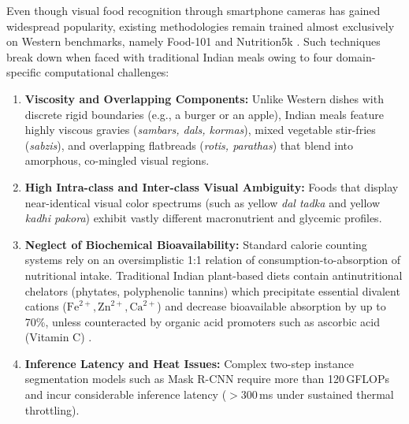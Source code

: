 \documentclass[conference]{IEEEtran}
\begin{document}
Even though visual food recognition through smartphone cameras has gained widespread popularity, existing methodologies remain trained almost exclusively on Western benchmarks, namely Food-101 \cite{bossard2014food101} and Nutrition5k \cite{thames2021nutrition5k}. Such techniques break down when faced with traditional Indian meals owing to four domain-specific computational challenges:
\begin{enumerate}
    \setlength{\itemsep}{1.2pt plus 0.3pt minus 0.2pt}
    \setlength{\parskip}{0pt}
    \item \textbf{Viscosity and Overlapping Components:} Unlike Western dishes with discrete rigid boundaries (e.g., a burger or an apple), Indian meals feature highly viscous gravies (\textit{sambars, dals, kormas}), mixed vegetable stir-fries (\textit{sabzis}), and overlapping flatbreads (\textit{rotis, parathas}) that blend into amorphous, co-mingled visual regions.
    \item \textbf{High Intra-class and Inter-class Visual Ambiguity:} Foods that display near-identical visual color spectrums (such as yellow \textit{dal tadka} and yellow \textit{kadhi pakora}) exhibit vastly different macronutrient and glycemic profiles.
    \item \textbf{Neglect of Biochemical Bioavailability:} Standard calorie counting systems rely on an oversimplistic 1:1 relation of consumption-to-absorption of nutritional intake. Traditional Indian plant-based diets contain antinutritional chelators (phytates, polyphenolic tannins) which precipitate essential divalent cations ($\text{Fe}^{2+}, \text{Zn}^{2+}, \text{Ca}^{2+}$) and decrease bioavailable absorption by up to 70\%, unless counteracted by organic acid promoters such as ascorbic acid (Vitamin C) \cite{longvah2017ifct, gibson2018phytates, hallberg1989iron}.
    \item \textbf{Inference Latency and Heat Issues:} Complex two-step instance segmentation models such as Mask R-CNN \cite{he2017maskrcnn} require more than 120\,GFLOPs and incur considerable inference latency ($>300$\,ms under sustained thermal throttling).
\end{enumerate}
\end{document}

